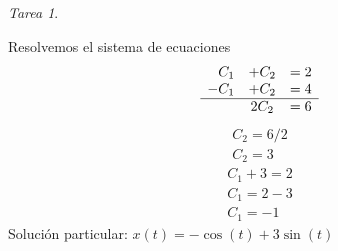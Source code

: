 \documentclass[12pt]{article} %
\theoremstyle{remark} %
\newtheorem{tarea}{Tarea}[section] %
\newcounter{ejercicio}[tarea]
\begin{document}
\begin{tarea}
\begin{ejercicio}
  Resolvemos el sistema de ecuaciones
  \[
  \begin{array}{rcl}
    C_1 & + C_2 & = 2\\
    -C_1 & + C_2 & = 4\\
    \hline
         & 2C_2 & = 6
  \end{array}
  \]
  \begin{gather*}
    C_2 = 6/2\\
    C_2 = 3
  \end{gather*}
  \begin{gather*}
    C_1 + 3 = 2\\
    C_1 = 2 - 3\\
    C_1 = -1
  \end{gather*}
  Solución particular: $x(t) = - \cos(t) + 3 \sin(t)$
\end{ejercicio}
\end{tarea}
\end{document}
